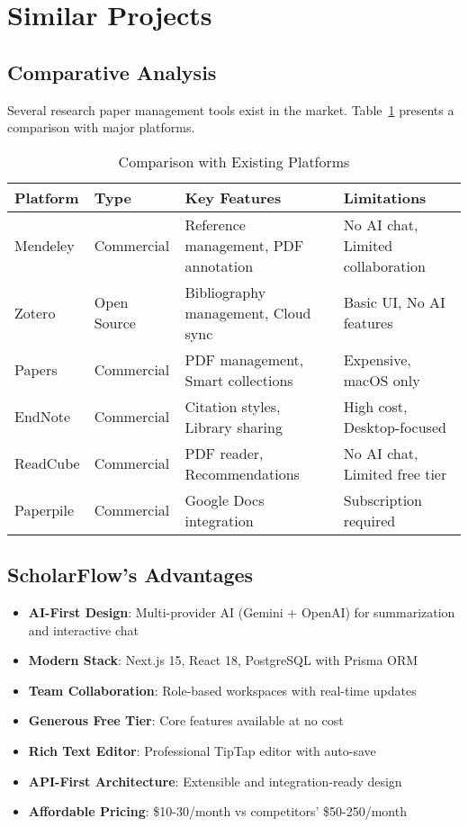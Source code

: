 \section{Similar Projects}
\label{sec:similar-projects}

\subsection{Comparative Analysis}

Several research paper management tools exist in the market. Table~\ref{tab:competitors} presents a comparison with major platforms.

\begin{table}[H]
\centering
\caption{Comparison with Existing Platforms}
\label{tab:competitors}
\small
\begin{tabular}{@{}llll@{}}
\toprule
\textbf{Platform} & \textbf{Type} & \textbf{Key Features} & \textbf{Limitations} \\
\midrule
Mendeley & Commercial & Reference management, PDF annotation & No AI chat, Limited collaboration \\
Zotero & Open Source & Bibliography management, Cloud sync & Basic UI, No AI features \\
Papers & Commercial & PDF management, Smart collections & Expensive, macOS only \\
EndNote & Commercial & Citation styles, Library sharing & High cost, Desktop-focused \\
ReadCube & Commercial & PDF reader, Recommendations & No AI chat, Limited free tier \\
Paperpile & Commercial & Google Docs integration & Subscription required \\
\bottomrule
\end{tabular}
\end{table}

\subsection{ScholarFlow's Advantages}

\begin{itemize}[leftmargin=*,topsep=5pt,itemsep=3pt]
    \item \textbf{AI-First Design}: Multi-provider AI (Gemini + OpenAI) for summarization and interactive chat
    \item \textbf{Modern Stack}: Next.js 15, React 18, PostgreSQL with Prisma ORM
    \item \textbf{Team Collaboration}: Role-based workspaces with real-time updates
    \item \textbf{Generous Free Tier}: Core features available at no cost
    \item \textbf{Rich Text Editor}: Professional TipTap editor with auto-save
    \item \textbf{API-First Architecture}: Extensible and integration-ready design
    \item \textbf{Affordable Pricing}: \$10-30/month vs competitors' \$50-250/month
\end{itemize}
